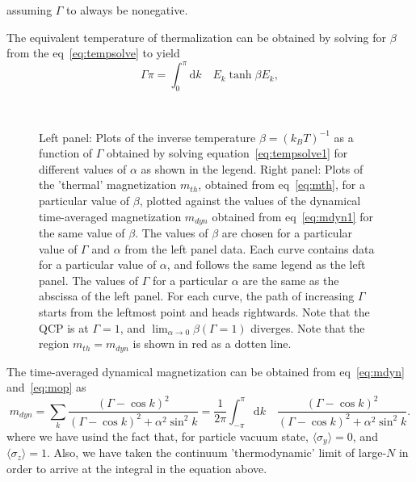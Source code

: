 \documentclass[a4paper,10pt]{article}
\begin{document}
assuming $\Gamma$ to always be nonegative. 
\begin{comment}

\textbf{Warning:Old Notation}\\


Thus, $C_\gamma=\prod_{k\in\gamma}v_k\prod_{q\not\in\gamma}u_q$. Note that, even with nonzero $\Gamma$, $u_k,v_k$, are very much like mutually reflected step functions provided $\Gamma$ is very small. Thus, $C_\gamma$ is expected to be almost zero for most values of $\gamma$, and sharply peaked at near-unity values for a small number of $\gamma$s (say, ${\gamma}'$). Thus, we can approximate the time average of the magnetization from Eq.~\ref{eq:timeavq} as $Q\approx\sum_{\gamma'}\mathcal{Q}_{\gamma'}$. 
All of the above can be simplified by the following equivalent formalism. 
\end{comment}
The equivalent temperature of thermalization can be obtained by solving for $\beta$ from the eq~\ref{eq:tempsolve} to yield
\begin{equation}
\label{eq:tempsolve1}
\Gamma\pi = \int^{\pi}_{0}\mathrm{d}k \quad E_k \tanh{\beta E_k},
\end{equation}
\begin{figure}[h!bt]
\ 
\caption{Left panel: Plots of the inverse temperature $\beta=(k_BT)^{-1}$ as a function of $\Gamma$ obtained by solving equation~\ref{eq:tempsolve1} for different values of $\alpha$ as shown in the legend. Right panel: Plots of the 'thermal' magnetization $m_{th}$, obtained from eq~\ref{eq:mth}, for a particular value of $\beta$, plotted against the values of the dynamical time-averaged magnetization $m_{dyn}$ obtained from eq~\ref{eq:mdyn1} for the same value of $\beta$. The values of $\beta$ are chosen for a particular value of $\Gamma$ and $\alpha$ from the left panel data. Each curve contains data for a particular value of $\alpha$, and follows the same legend as the left panel. The values of $\Gamma$ for a particular $\alpha$ are the same as the abscissa of the left panel. For each curve, the path of increasing $\Gamma$ starts from the leftmost point and heads rightwards. Note that the QCP is at $\Gamma=1$, and $\lim_{\alpha\rightarrow0}\beta(\Gamma=1)$ diverges. Note that the region $m_{th}=m_{dyn}$ is 
shown in red as a dotten line.}
\label{fig:vacquench}
\end{figure}
The time-averaged dynamical magnetization can be obtained from eq~\ref{eq:mdyn} and~\ref{eq:mop} as
\begin{equation}
\label{eq:mdyn1}
m_{dyn}=\sum _k\frac{(\Gamma -\cos{k})^2}{\left(\Gamma-\cos{k}\right)^2+\alpha ^2 \sin^2{k}}=\frac{1}{2\pi}\int^\pi_{-\pi}\mathrm{d}k\quad \frac{(\Gamma -\cos{k})^2}{\left(\Gamma-\cos{k}\right)^2+\alpha ^2 \sin^2{k}}.
\end{equation}
where we have usind the fact that, for particle vacuum state, $\langle\sigma_y\rangle=0$, and $\langle\sigma_z\rangle=1$. Also, we have taken the continuum 'thermodynamic' limit of large-$N$ in order to arrive at the integral in the equation above.
\end{document}
